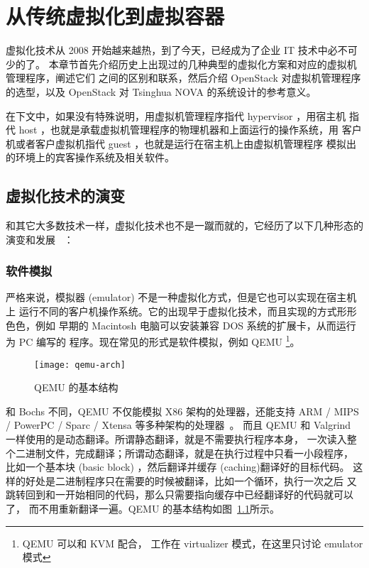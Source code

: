 \chapter{从传统虚拟化到虚拟容器}
\label{cha:virtualization-and-container}

虚拟化技术从 2008 开始越来越热，到了今天，已经成为了企业 IT 技术中必不可少的了。
本章节首先介绍历史上出现过的几种典型的虚拟化方案和对应的虚拟机管理程序，阐述它们
之间的区别和联系，然后介绍 OpenStack 对虚拟机管理程序的选型，以及 OpenStack
对 Tsinghua NOVA 的系统设计的参考意义。

在下文中，如果没有特殊说明，用虚拟机管理程序指代 hypervisor ，用宿主机
指代 host ，也就是承载虚拟机管理程序的物理机器和上面运行的操作系统，用
客户机或者客户虚拟机指代 guest ，也就是运行在宿主机上由虚拟机管理程序
模拟出的环境上的宾客操作系统及相关软件。

\section{虚拟化技术的演变}

和其它大多数技术一样，虚拟化技术也不是一蹴而就的，它经历了以下几种形态的演变和发展
~\cite{deep-into-kvm}：

\subsection{软件模拟}
\label{emulators}

严格来说，模拟器 (emulator) 不是一种虚拟化方式，但是它也可以实现在宿主机上
运行不同的客户机操作系统。它的出现早于虚拟化技术，而且实现的方式形形色色，例如
早期的 Macintosh 电脑可以安装兼容 DOS 系统的扩展卡，从而运行为 PC 编写的
程序。现在常见的形式是软件模拟，例如 QEMU \footnote{QEMU 可以和 KVM 配合，
工作在 virtualizer 模式，在这里只讨论 emulator 模式}。

\begin{figure}[h]
    \centering
    \texttt{[image: qemu-arch]}
    \caption{QEMU 的基本结构}
    \label{fig:qemu-arch}
\end{figure}

和 Bochs 不同，QEMU 不仅能模拟 X86 架构的处理器，还能支持 ARM / MIPS / PowerPC
 / Sparc / Xtensa 等多种架构的处理器~\cite{qemu-internals}。
而且 QEMU 和 Valgrind 一样使用的是动态翻译。所谓静态翻译，就是不需要执行程序本身，
一次读入整个二进制文件，完成翻译；所谓动态翻译，就是在执行过程中只看一小段程序，
比如一个基本块 (basic block) ，然后翻译并缓存 (caching)翻译好的目标代码。
这样的好处是二进制程序只在需要的时候被翻译，比如一个循环，执行一次之后
又跳转回到和一开始相同的代码，那么只需要指向缓存中已经翻译好的代码就可以了，
而不用重新翻译一遍。QEMU 的基本结构如图~\ref{fig:qemu-arch}所示。

